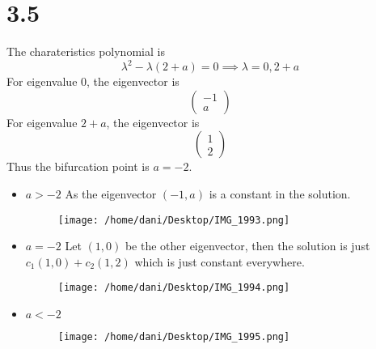 \documentclass[11pt]{article}
\theoremstyle{mystyle}
\theoremstyle{definition}
\begin{document}
\section*{3.5}
The charateristics polynomial is 
\[
  \lambda^2 -\lambda(2+a) = 0 \implies \lambda = 0,2+a
\]
For eigenvalue 0, the eigenvector is 
\[
  \begin{pmatrix}
    -1 \\
    a
  \end{pmatrix}
\]
For eigenvalue $2+a$, the eigenvector is 
\[
  \begin{pmatrix}
    1 \\
    2
  \end{pmatrix}
\]
Thus the bifurcation point is $a=-2$. \\
\begin{itemize}
  \item $a > -2$
    As the eigenvector $(-1,a)$ is a constant in the solution. 

\begin{figure}[h]
  \centering
  \texttt{[image: /home/dani/Desktop/IMG\_1993.png]}
  \caption{}
  \label{fig:img_1993}
\end{figure}
  \item $a = -2$
    Let $(1,0)$ be the other eigenvector, then the solution is just 
    $c_1 (1,0) + c_2 (1,2)$ which is just constant everywhere. 
\begin{figure}[h]
  \centering
  \texttt{[image: /home/dani/Desktop/IMG\_1994.png]}
  \caption{}
  \label{fig:img_1994}
\end{figure}
\clearpage
  \item $a < -2$
\begin{figure}[h]
  \centering
  \texttt{[image: /home/dani/Desktop/IMG\_1995.png]}
  \caption{}
  \label{fig:img_1995}
\end{figure}
\end{itemize}
\clearpage
\end{document}
